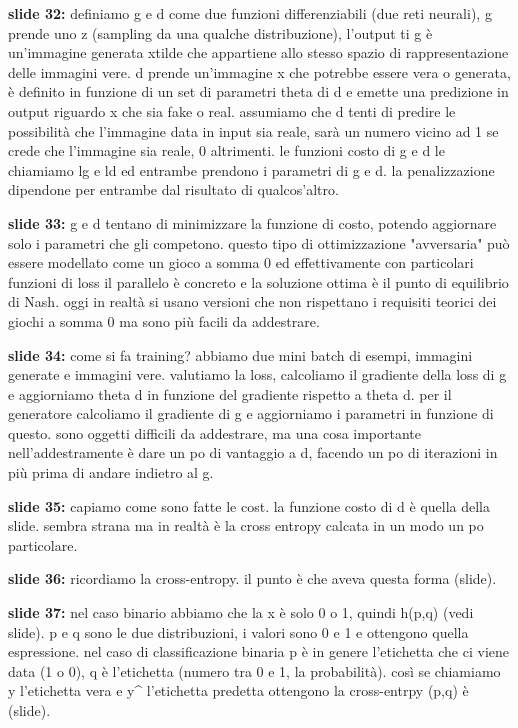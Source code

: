 \textbf{slide 32:} definiamo g e d come due funzioni differenziabili (due reti neurali), g prende uno z
(sampling da una qualche distribuzione), l'output ti g è un'immagine generata xtilde che appartiene allo stesso
spazio di rappresentazione delle immagini vere. d prende un'immagine x che potrebbe essere vera o generata,
è definito in funzione di un set di parametri theta di d e emette una predizione in output riguardo x che sia
fake o real. assumiamo che d tenti di predire le possibilità che l'immagine data in input sia reale, sarà un
numero vicino ad 1 se crede che l'immagine sia reale, 0 altrimenti. le funzioni costo di g e d le chiamiamo 
lg e ld ed entrambe prendono i parametri di g e d. la penalizzazione dipendone per entrambe dal risultato 
di qualcos'altro. 

\textbf{slide 33:} g e d tentano di minimizzare la funzione di costo, potendo aggiornare solo i parametri
che gli competono. questo tipo di ottimizzazione "avversaria" può essere modellato come un gioco a somma 0
ed effettivamente con particolari funzioni di loss il parallelo è concreto e la soluzione ottima è il punto 
di equilibrio di Nash. oggi in realtà si usano versioni che non rispettano i requisiti teorici dei giochi a somma
0 ma sono più facili da addestrare. 

\textbf{slide 34:} come si fa training? abbiamo due mini batch di esempi, immagini generate e immagini vere.
valutiamo la loss, calcoliamo il gradiente della loss di g e aggiorniamo theta d in funzione del gradiente 
rispetto a theta d. per il generatore calcoliamo il gradiente di g e aggiorniamo i parametri in funzione di
questo. sono oggetti difficili da addestrare, ma una cosa importante nell'addestramente è dare un po di 
vantaggio a d, facendo un po di iterazioni in più prima di andare indietro al g.

\textbf{slide 35:} capiamo come sono fatte le cost. la funzione costo di d è quella della slide. sembra strana
ma in realtà è la cross entropy calcata in un modo un po particolare. 

\textbf{slide 36:} ricordiamo la cross-entropy. il punto è che aveva questa forma (slide). 

\textbf{slide 37:} nel caso binario abbiamo che la x è solo 0 o 1, quindi h(p,q) (vedi slide). p e q sono le
due distribuzioni, i valori sono 0 e 1 e ottengono quella espressione. nel caso di classificazione binaria p
è in genere l'etichetta che ci viene data (1 o 0), q è l'etichetta (numero tra 0 e 1, la probabilità). così
se chiamiamo y l'etichetta vera e y^ l'etichetta predetta ottengono la cross-entrpy (p,q) è (slide).

